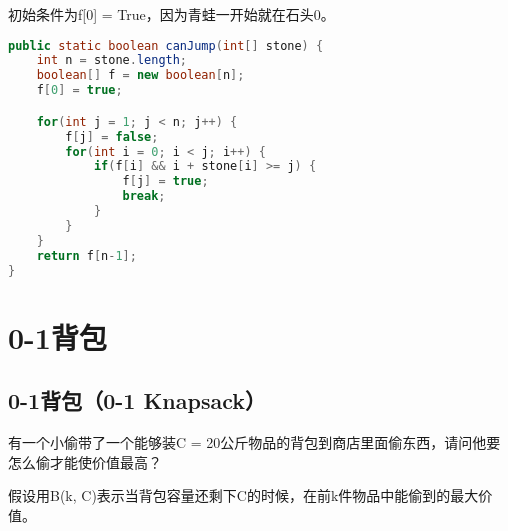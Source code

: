 初始条件为f[0] = True，因为青蛙一开始就在石头0。 \\


\begin{lstlisting}[language=Java]
public static boolean canJump(int[] stone) {
    int n = stone.length;
    boolean[] f = new boolean[n];
    f[0] = true;

    for(int j = 1; j < n; j++) {
        f[j] = false;
        for(int i = 0; i < j; i++) {
            if(f[i] && i + stone[i] >= j) {
                f[j] = true;
                break;
            }
        }
    }
    return f[n-1];
}
\end{lstlisting}

\newpage

\section{0-1背包}

\subsection{0-1背包（0-1 Knapsack）}

有一个小偷带了一个能够装C = 20公斤物品的背包到商店里面偷东西，请问他要怎么偷才能使价值最高？ \\

\begin{table}[H]
	\centering
	\caption{物品信息}
\end{table}

假设用B(k, C)表示当背包容量还剩下C的时候，在前k件物品中能偷到的最大价值。

\vspace{-0.5cm}

